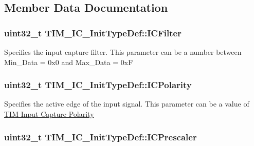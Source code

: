 \subsection{Member Data Documentation}
\hypertarget{struct_t_i_m___i_c___init_type_def_ae8432aa11b5495b252ac7ae299eabb32}{
\subsubsection[{I\-C\-Filter}]{\setlength{\rightskip}{0pt plus 5cm}uint32\-\_\-t T\-I\-M\-\_\-\-I\-C\-\_\-\-Init\-Type\-Def\-::\-I\-C\-Filter}}\label{struct_t_i_m___i_c___init_type_def_ae8432aa11b5495b252ac7ae299eabb32}
Specifies the input capture filter. This parameter can be a number between Min\-\_\-\-Data = 0x0 and Max\-\_\-\-Data = 0x\-F \hypertarget{struct_t_i_m___i_c___init_type_def_ab122383ebc0926c49a814546471da9b3}{
\subsubsection[{I\-C\-Polarity}]{\setlength{\rightskip}{0pt plus 5cm}uint32\-\_\-t T\-I\-M\-\_\-\-I\-C\-\_\-\-Init\-Type\-Def\-::\-I\-C\-Polarity}}\label{struct_t_i_m___i_c___init_type_def_ab122383ebc0926c49a814546471da9b3}
Specifies the active edge of the input signal. This parameter can be a value of \hyperlink{group___t_i_m___input___capture___polarity}{T\-I\-M Input Capture Polarity} \hypertarget{struct_t_i_m___i_c___init_type_def_a452a4a459b6f7b7c478db032de9b0d72}{
\subsubsection[{I\-C\-Prescaler}]{\setlength{\rightskip}{0pt plus 5cm}uint32\-\_\-t T\-I\-M\-\_\-\-I\-C\-\_\-\-Init\-Type\-Def\-::\-I\-C\-Prescaler}}\label{struct_t_i_m___i_c___init_type_def_a452a4a459b6f7b7c478db032de9b0d72}
